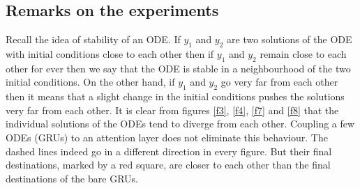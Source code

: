 \documentclass{article}
\numberwithin{equation}{section}
\begin{document}
\subsection{Remarks on the experiments}
Recall the idea of stability of an ODE. If $y_1$ and $y_2$ are two solutions
of the ODE with initial conditions close to each other then if $y_1$ and $y_2$
remain close to each other for ever then we say that the ODE is stable in a
neighbourhood of the two initial conditions. On the other hand, if $y_1$ and 
$y_2$ go very far from each other then it means that a slight change in the
initial conditions pushes the solutions very far from each other. It is clear
from figures \ref{f3}, \ref{f4}, \ref{f7} and \ref{f8} that the individual 
solutions of the ODEs tend to diverge from each other. Coupling a few ODEs 
(GRUs) to an attention layer does not eliminate this behaviour. The dashed 
lines indeed go in a different direction in every figure. But their final 
destinations, marked by a red square, are closer to each other than the
final destinations of the bare GRUs.



\end{document}
